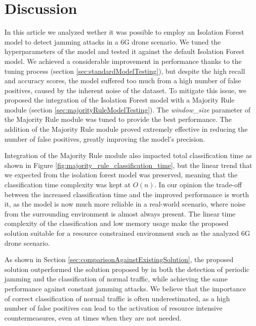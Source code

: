 \documentclass[futureinternet,article,submit,pdftex,moreauthors]{Definitions/mdpi}
\begin{document}
\section{Discussion}


In this article we analyzed wether it was possible to employ an Isolation Forest model to detect jamming attacks in a 6G drone scenario. We tuned the hyperparameters of the model and tested it against the default Isolation Forest model. 
We achieved a considerable improvement in performance thanks to the tuning process (section \ref{sec:standardModelTesting}), but despite the high recall and accuracy scores, the model suffered too much from a high number of false positives, caused by the inherent noise of the dataset. 
To mitigate this issue, we proposed the integration of the Isolation Forest model with a Majority Rule module (section \ref{sec:majorityRuleModelTesting}). The \textit{window\_size} parameter of the Majority Rule module was tuned to provide the best performance.
The addition of the Majority Rule module proved extremely effective in reducing the number of false positives, greatly improving the model's precision. 

Integration of the Majority Rule module also impacted total classification time as shown in Figure \ref{fig:majority_rule_classification_time}, but the linear trend \cite{IsolationForestLiu} that we expected from the isolation forest model was preserved, meaning that the classification time complexity was kept at $O(n)$. 
In our opinion the trade-off between the increased classification time and the improved performance is worth it, as the model is now much more reliable in a real-world scenario, where noise from the surrounding environment is almost always present.
The linear time complexity of the classification and low memory usage make the proposed solution suitable for a resource constrained environment such as the analyzed 6G drone scenario.

As shown in Section \ref{sec:comparisonAgainstExistingSolution}, the proposed solution outperformed the solution proposed by \cite{JammingDetectionIoT-Hussain} in both the detection of periodic jamming and the classification of normal traffic, while achieving the same performance against constant jamming attacks. 
We believe that the importance of correct classification of normal traffic is often underestimated, as a high number of false positives can lead to the activation of resource intensive countermeasures, even at times when they are not needed. 
\end{document}
